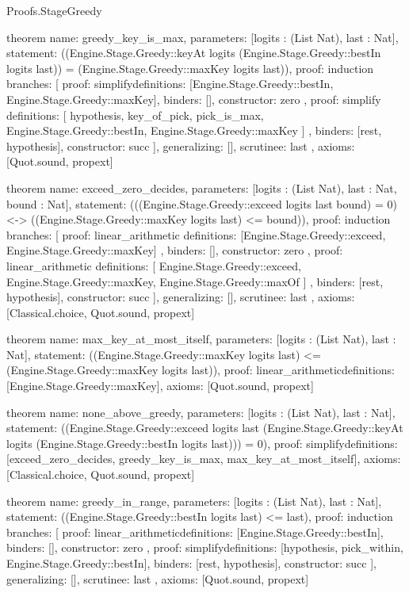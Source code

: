 \begin{lexlean}{Proofs.StageGreedy}
\begin{semanticmodule}
theorem{
  name: greedy_key_is_max,
  parameters: [logits : (List Nat), last : Nat],
  statement: ((Engine.Stage.Greedy::keyAt logits (Engine.Stage.Greedy::bestIn logits last)) = (Engine.Stage.Greedy::maxKey logits last)),
  proof: induction{
    branches: [
      {
        proof: simplify{definitions: [Engine.Stage.Greedy::bestIn, Engine.Stage.Greedy::maxKey]},
        binders: [],
        constructor: zero
      },
      {
        proof: simplify{
          definitions: [
            hypothesis,
            key_of_pick,
            pick_is_max,
            Engine.Stage.Greedy::bestIn,
            Engine.Stage.Greedy::maxKey
          ]
        },
        binders: [rest, hypothesis],
        constructor: succ
      }
    ],
    generalizing: [],
    scrutinee: last
  },
  axioms: [Quot.sound, propext]
}

theorem{
  name: exceed_zero_decides,
  parameters: [logits : (List Nat), last : Nat, bound : Nat],
  statement: (((Engine.Stage.Greedy::exceed logits last bound) = 0) <-> ((Engine.Stage.Greedy::maxKey logits last) <= bound)),
  proof: induction{
    branches: [
      {
        proof: linear_arithmetic{
          definitions: [Engine.Stage.Greedy::exceed, Engine.Stage.Greedy::maxKey]
        },
        binders: [],
        constructor: zero
      },
      {
        proof: linear_arithmetic{
          definitions: [
            Engine.Stage.Greedy::exceed,
            Engine.Stage.Greedy::maxKey,
            Engine.Stage.Greedy::maxOf
          ]
        },
        binders: [rest, hypothesis],
        constructor: succ
      }
    ],
    generalizing: [],
    scrutinee: last
  },
  axioms: [Classical.choice, Quot.sound, propext]
}

theorem{
  name: max_key_at_most_itself,
  parameters: [logits : (List Nat), last : Nat],
  statement: ((Engine.Stage.Greedy::maxKey logits last) <= (Engine.Stage.Greedy::maxKey logits last)),
  proof: linear_arithmetic{definitions: [Engine.Stage.Greedy::maxKey]},
  axioms: [Quot.sound, propext]
}

theorem{
  name: none_above_greedy,
  parameters: [logits : (List Nat), last : Nat],
  statement: ((Engine.Stage.Greedy::exceed logits last (Engine.Stage.Greedy::keyAt logits (Engine.Stage.Greedy::bestIn logits last))) = 0),
  proof: simplify{definitions: [exceed_zero_decides, greedy_key_is_max, max_key_at_most_itself]},
  axioms: [Classical.choice, Quot.sound, propext]
}

theorem{
  name: greedy_in_range,
  parameters: [logits : (List Nat), last : Nat],
  statement: ((Engine.Stage.Greedy::bestIn logits last) <= last),
  proof: induction{
    branches: [
      {
        proof: linear_arithmetic{definitions: [Engine.Stage.Greedy::bestIn]},
        binders: [],
        constructor: zero
      },
      {
        proof: simplify{definitions: [hypothesis, pick_within, Engine.Stage.Greedy::bestIn]},
        binders: [rest, hypothesis],
        constructor: succ
      }
    ],
    generalizing: [],
    scrutinee: last
  },
  axioms: [Quot.sound, propext]
}
\end{semanticmodule}
\end{lexlean}
